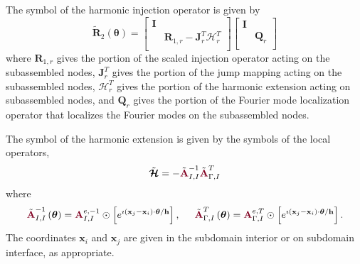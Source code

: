 \begin{definition}
The symbol of the harmonic injection operator is given by
\begin{equation}
\tilde{\mathbf{R}}_2 \left( \boldsymbol{\theta} \right) =
\begin{bmatrix}
\mathbf{I} &                                                                  \\
           & \mathbf{R}_{1, r} - \mathbf{J}^T_r \boldsymbol{\mathcal{H}}^T_r  \\
\end{bmatrix}
\begin{bmatrix}
\mathbf{I} &                 \\
           & \mathbf{Q}_{r}  \\
\end{bmatrix}
\end{equation}
where $\mathbf{R}_{1, r}$ gives the portion of the scaled injection operator acting on the subassembled nodes, $\mathbf{J}^T_r$ gives the portion of the jump mapping acting on the subassembled nodes, $\boldsymbol{\mathcal{H}}^T_r$ gives the portion of the harmonic extension acting on subassembled nodes, and $\mathbf{Q}_r$ gives the portion of the Fourier mode localization operator that localizes the Fourier modes on the subassembled nodes.

The symbol of the harmonic extension is given by the symbols of the local operators,
\begin{equation}
\tilde{\boldsymbol{\mathcal{H}}} = - \tilde{{\color{burgundy}\mathbf{A}}}_{I, I}^{-1} \tilde{{\color{burgundy}\mathbf{A}}}_{\Gamma, I}^T
\end{equation}
where
\begin{equation}
\tilde{{\color{burgundy}\mathbf{A}}}_{I, I}^{-1} \left( \boldsymbol{\theta} \right) = {\color{burgundy}\mathbf{A}}_{I, I}^{e, -1} \odot \left[ e^{\imath \left( \mathbf{x}_j - \mathbf{x}_i \right) \cdot \boldsymbol{\theta} / \mathbf{h}} \right],
\hspace{5mm}
\tilde{{\color{burgundy}\mathbf{A}}}_{\Gamma, I}^T \left( \boldsymbol{\theta} \right) = {\color{burgundy}\mathbf{A}}_{\Gamma, I}^{e, T} \odot \left[ e^{\imath \left( \mathbf{x}_j - \mathbf{x}_i \right) \cdot \boldsymbol{\theta} / \mathbf{h}} \right].
\end{equation}
The coordinates $\mathbf{x}_i$ and $\mathbf{x}_j$ are given in the subdomain interior or on subdomain interface, as appropriate.


\end{definition}
